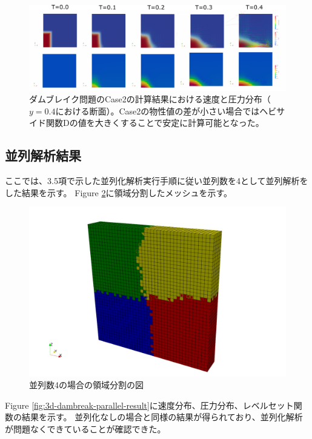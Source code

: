 \documentclass[8pt,a4paper]{article}
\begin{document}
\begin{figure}[H]
	\centering
	\includegraphics[width=18truecm]{pics/3d-dambreak/levelset_velocity.pdf}
	\caption{ダムブレイク問題のCase2の計算結果における速度と圧力分布（$y=0.4$における断面）。Case2の物性値の差が小さい場合ではヘビサイド関数Dの値を大きくすることで安定に計算可能となった。}
	\label{fig:3d-dambreak-diverge}
\end{figure}

\subsection{並列解析結果}
ここでは、3.5項で示した並列化解析実行手順に従い並列数を4として並列解析をした結果を示す。
Figure \ref{fig:3d-dambreak-parallel-partition}に領域分割したメッシュを示す。

\begin{figure}[H]
	\centering
	\includegraphics[width=18truecm]{pics/3d-dambreak-parallel/partition4.pdf}
	\caption{並列数4の場合の領域分割の図}
	\label{fig:3d-dambreak-parallel-partition}
\end{figure}

Figure \ref{fig:3d-dambreak-parallel-result}に速度分布、圧力分布、レベルセット関数の結果を示す。
並列化なしの場合と同様の結果が得られており、並列化解析が問題なくできていることが確認できた。
\end{document}
